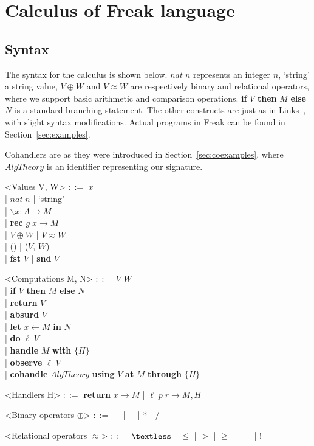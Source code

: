 \documentclass[declaration,shortabstract]{iithesis}
\theoremstyle{definition} \newtheorem{definition}{Definition}[chapter]
\theoremstyle{remark} \newtheorem{remark}[definition]{Observation}
\theoremstyle{plain} \newtheorem{theorem}[definition]{Theorem}
\theoremstyle{plain} \newtheorem{lemma}[definition]{Lemma}
\begin{document}
\chapter{Calculus of Freak language}\label{chapter:calculus-of-freak-language}
\section{Syntax}

    The syntax for the calculus is shown below. $nat \; n$ represents an integer $n$,
    `string' a string value, $V \oplus W$ and $V \approx W$ are respectively
    binary and relational operators, where we support basic arithmetic and
    comparison operations. \textbf{if} $V$ \textbf{then} $M$ \textbf{else} $N$
    is a standard branching statement. The other constructs are just as in
    Links~\cite{handlers-cps-journal}, with slight syntax modifications.
    Actual programs in Freak can be found in Section~\ref{sec:examples}.

    Cohandlers are as they were introduced in Section~\ref{sec:coexamples},
    where $AlgTheory$ is an identifier representing our signature.

    \begin{grammar}

        <Values V, W> $::=$ $ x $ \\
            | $nat \; n$ | `string'  \\
            | $ \backslash x : A \rightarrow M $ \\
            | \textbf{rec} $ g \; x \rightarrow M $\\
            | $V \oplus W$ | $V \approx W$ \\
            | () | ($V$, $W$) \\
            | \textbf{fst} $V$ | \textbf{snd} $V$

        <Computations M, N> $::=$ $ V $ $ W $ \\
            | \textbf{if} $V$ \textbf{then} $M$ \textbf{else} $N$ \\
            | \textbf{return} $V$ \\
            | \textbf{absurd} $ V $ \\
            | \textbf{let} $ x \leftarrow M $ \textbf{in} $ N $ \\
            | \textbf{do} $\ell \; V$ \\
            | \textbf{handle} $M$ \textbf{with} $ \{ H \} $ \\
            | \textbf{observe} $\ell \; V$ \\
            | \textbf{cohandle} $AlgTheory$ \textbf{using} $V$ \textbf{at} $M$ \textbf{through} $ \{ H \} $

        <Handlers H> $::=$ \textbf{return} $ x \rightarrow M $ | $ \ell \; p \; r \rightarrow M, H $

        <Binary operators $\oplus$> $::=$ + | $-$ | * | /

        <Relational operators $\approx$> $::=$ $ \textless $ | $\leqslant$ | $>$ | $\geqslant$ | == | $!= $

    \end{grammar}
\end{document}
